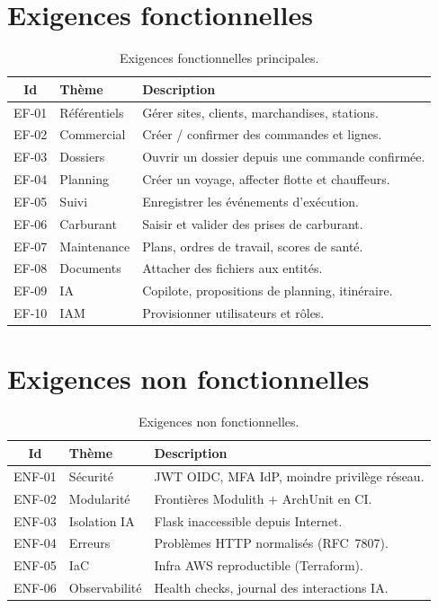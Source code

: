 
\section{Exigences fonctionnelles}

\begin{table}[ht]
\centering
\caption{Exigences fonctionnelles principales.}
\label{tab:ef}
\begin{tabular}{@{}cp{3.2cm}p{8cm}@{}}
\toprule
Id & Thème & Description \\
\midrule
EF-01 & Référentiels & Gérer sites, clients, marchandises, stations. \\
EF-02 & Commercial & Créer / confirmer des commandes et lignes. \\
EF-03 & Dossiers & Ouvrir un dossier depuis une commande confirmée. \\
EF-04 & Planning & Créer un voyage, affecter flotte et chauffeurs. \\
EF-05 & Suivi & Enregistrer les événements d'exécution. \\
EF-06 & Carburant & Saisir et valider des prises de carburant. \\
EF-07 & Maintenance & Plans, ordres de travail, scores de santé. \\
EF-08 & Documents & Attacher des fichiers aux entités. \\
EF-09 & IA & Copilote, propositions de planning, itinéraire. \\
EF-10 & IAM & Provisionner utilisateurs et rôles. \\
\bottomrule
\end{tabular}
\end{table}

\section{Exigences non fonctionnelles}

\begin{table}[ht]
\centering
\caption{Exigences non fonctionnelles.}
\label{tab:enf}
\begin{tabular}{@{}cp{3.2cm}p{8cm}@{}}
\toprule
Id & Thème & Description \\
\midrule
ENF-01 & Sécurité & JWT OIDC, MFA IdP, moindre privilège réseau. \\
ENF-02 & Modularité & Frontières Modulith + ArchUnit en CI. \\
ENF-03 & Isolation IA & Flask inaccessible depuis Internet. \\
ENF-04 & Erreurs & Problèmes HTTP normalisés (RFC~7807). \\
ENF-05 & IaC & Infra AWS reproductible (Terraform). \\
ENF-06 & Observabilité & Health checks, journal des interactions IA. \\
\bottomrule
\end{tabular}
\end{table}

